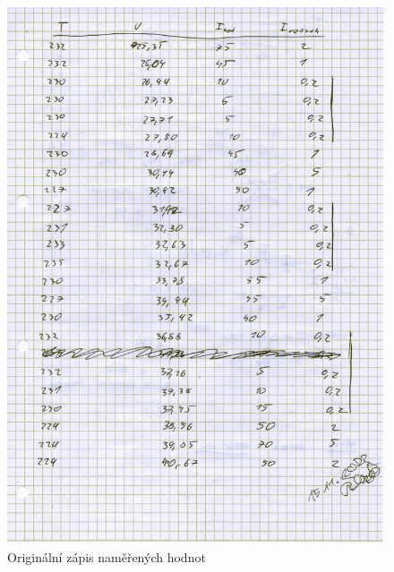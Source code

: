 \documentclass[titlepage]{article}
\begin{document}
\begin{figure}[H]
\begin{minipage}{0.4\textwidth}
  \includegraphics[width=\textwidth]{scan/page3.png}
 \end{minipage}
 \caption{Originální zápis naměřených hodnot}
\end{figure}
\end{document}
